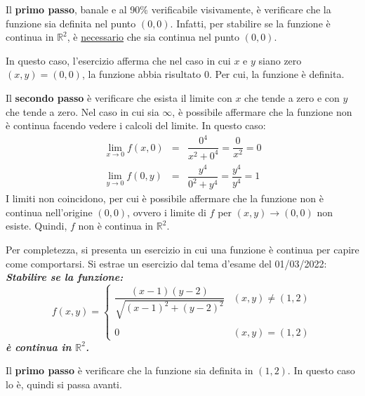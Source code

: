 \documentclass[a4paper]{article}
\begin{document}
	\noindent
	Il \textbf{primo passo}, banale e al 90\% verificabile visivamente, è verificare che la funzione sia definita nel punto $\left(0,0\right)$. Infatti, per stabilire se la funzione è continua in $\mathbb{R}^{2}$, è \underline{necessario} che sia continua nel punto $\left(0,0\right)$.

	In questo caso, l'esercizio afferma che nel caso in cui $x$ e $y$ siano zero $\left(x,y\right) = \left(0,0\right)$, la funzione abbia risultato $0$. Per cui, la funzione è definita.\newline

	\noindent
	Il \textbf{secondo passo} è verificare che esista il limite con $x$ che tende a zero e con $y$ che tende a zero. Nel caso in cui sia $\infty$, è possibile affermare che la funzione non è continua facendo vedere i calcoli del limite. In questo caso:
	\begin{equation*}
		\begin{array}{rcl}
			\displaystyle\lim_{x \rightarrow 0} f\left(x,0\right) &=& \dfrac{0^{4}}{x^{2} + 0^{4}} = \dfrac{0}{x^{2}} = 0 \\ [1.5em]
			\displaystyle\lim_{y \rightarrow 0} f\left(0,y\right) &=& \dfrac{y^{4}}{0^{2} + y^{4}} = \dfrac{y^{4}}{y^{4}} = 1
		\end{array}
	\end{equation*}
	I limiti non coincidono, per cui è possibile affermare che la funzione non è continua nell'origine $\left(0,0\right)$, ovvero i limite di $f$ per $\left(x,y\right) \rightarrow \left(0,0\right)$ non esiste. Quindi, $f$ non è continua in $\mathbb{R}^{2}$.\newline

	\noindent
	Per completezza, si presenta un esercizio in cui una funzione è continua per capire come comportarsi. Si estrae un esercizio dal tema d'esame del 01/03/2022: \textcolor{Green4}{\textbf{\emph{Stabilire se la funzione:}}
	\begin{equation*}
		f\left(x,y\right) = \begin{cases}
			\dfrac{\left(x-1\right)\left(y-2\right)}{\sqrt{\left(x-1\right)^{2} + \left(y-2\right)^{2}}} & \left(x,y\right) \ne \left(1,2\right) \\
			\\
			0	& \left(x,y\right) = \left(1,2\right)
		\end{cases}
	\end{equation*}
	\textbf{\emph{è continua in $\mathbb{R}^{2}$.}}}\newpage

	\noindent
	Il \textbf{primo passo} è verificare che la funzione sia definita in $\left(1,2\right)$. In questo caso lo è, quindi si passa avanti.\newline
\end{document}
